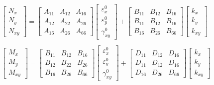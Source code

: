 \documentclass[smallextended]{svjour3}       %
\begin{document}
\begin{equation} \label{eq:force_and_moments}
	\begin{array}{l}

	\begin{bmatrix}
		N_x \\
		N_y \\
		N_{xy}
	\end{bmatrix}
	=
	\begin{bmatrix}
		A_{11} & A_{12} & A_{16} \\
		A_{12} & A_{22} & A_{26} \\
		A_{16} & A_{26} & A_{66} 
	\end{bmatrix}
    \begin{bmatrix}
		\varepsilon_x^0 \\
        \varepsilon_y^0 \\
		\gamma_{xy}^0
    \end{bmatrix} 
	+
	\begin{bmatrix}
		B_{11} & B_{12} & B_{16} \\
		B_{11} & B_{12} & B_{16} \\
		B_{16} & B_{26} & B_{66} 
	\end{bmatrix}
	\begin{bmatrix}
		k_x \\
		k_y \\
		k_{xy} 
	\end{bmatrix}  \\
	\\

	\begin{bmatrix}
		M_x \\
		M_y \\
		M_{xy}
	\end{bmatrix}
	=
	\begin{bmatrix}
		B_{11} & B_{12} & B_{16} \\
		B_{12} & B_{22} & B_{26} \\
		B_{16} & B_{26} & B_{66} 
	\end{bmatrix}
    \begin{bmatrix}
		\varepsilon_x^0 \\
        \varepsilon_y^0 \\
		\gamma_{xy}^0
    \end{bmatrix} 
	+
	\begin{bmatrix}
		D_{11} & D_{12} & D_{16} \\
		D_{11} & D_{12} & D_{16} \\
		D_{16} & D_{26} & D_{66} 
	\end{bmatrix}
	\begin{bmatrix}
		k_x \\
		k_y \\
		k_{xy} 
	\end{bmatrix}
	\end{array}
\end{equation}
\end{document}
